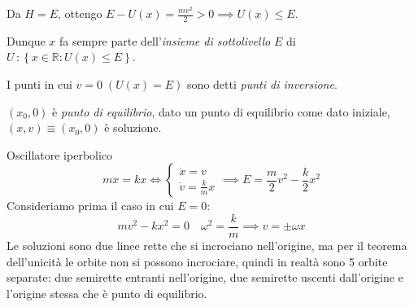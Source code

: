 \begin{remark}
    Da $H=E$, ottengo $E-U(x)= \frac{mv^2}{2}>0\implies U(x)\leq E $.
\end{remark}
Dunque $x$ fa sempre parte dell'\textit{insieme di sottolivello} $E $ di $U \,: \left\{ x\in \mathbb{R}:U(x)\leq E  \right\}$.
\begin{definition}
    I punti in cui $v= 0 \;(U(x)= E )$ sono detti \textit{punti di inversione}.
\end{definition}
\begin{definition}
    $(x_0,0)$ è \textit{punto di equilibrio}, dato un punto di equilibrio come dato iniziale, $(x,v)\equiv(x_0,0)$ è soluzione.
\end{definition}

\begin{example}
    Oscillatore iperbolico 
    \begin{equation}
        m\ddot{x}= kx \iff \begin{cases}
            \dot{x}=v\\
            \dot{v}= \frac{k}{m}x
        \end{cases}\implies
        E = \frac{m}{2}v^2  -\frac{k}{2}x^2
    \end{equation}
    Consideriamo prima il caso in cui $E=0:$
    \begin{equation}
        mv^2  -kx^2=0 \quad \omega^2=\frac{k}{m}\implies v = \pm \omega x 
    \end{equation}
    Le soluzioni sono due linee rette che si incrociano nell'origine, ma per il teorema dell'unicità le orbite non si possono incrociare, 
    quindi in realtà sono 5 orbite separate: due semirette entranti nell'origine, due semirette uscenti dall'origine e l'origine stessa che è punto di equilibrio.
    \begin{figure}[ht]
        \centering
\end{figure}
\end{example}
